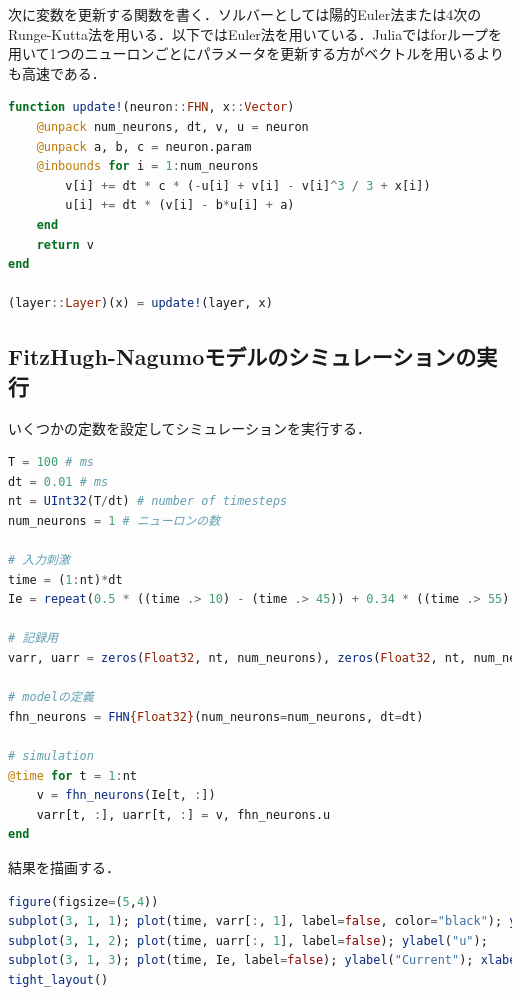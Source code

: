 次に変数を更新する関数を書く．ソルバーとしては陽的Euler法または4次のRunge-Kutta法を用いる．以下ではEuler法を用いている．Juliaではforループを用いて1つのニューロンごとにパラメータを更新する方がベクトルを用いるよりも高速である．
\begin{lstlisting}[language=julia]
function update!(neuron::FHN, x::Vector)
    @unpack num_neurons, dt, v, u = neuron
    @unpack a, b, c = neuron.param
    @inbounds for i = 1:num_neurons
        v[i] += dt * c * (-u[i] + v[i] - v[i]^3 / 3 + x[i])
        u[i] += dt * (v[i] - b*u[i] + a)
    end
    return v
end

(layer::Layer)(x) = update!(layer, x)
\end{lstlisting}
\subsection{FitzHugh-Nagumoモデルのシミュレーションの実行}
いくつかの定数を設定してシミュレーションを実行する．
\begin{lstlisting}[language=julia]
T = 100 # ms
dt = 0.01 # ms
nt = UInt32(T/dt) # number of timesteps
num_neurons = 1 # ニューロンの数

# 入力刺激
time = (1:nt)*dt
Ie = repeat(0.5 * ((time .> 10) - (time .> 45)) + 0.34 * ((time .> 55) - (time .> 90)), 1, num_neurons)  # injection current

# 記録用
varr, uarr = zeros(Float32, nt, num_neurons), zeros(Float32, nt, num_neurons)

# modelの定義
fhn_neurons = FHN{Float32}(num_neurons=num_neurons, dt=dt)

# simulation
@time for t = 1:nt
    v = fhn_neurons(Ie[t, :])
    varr[t, :], uarr[t, :] = v, fhn_neurons.u
end
\end{lstlisting}
結果を描画する．
\begin{lstlisting}[language=julia]
figure(figsize=(5,4))
subplot(3, 1, 1); plot(time, varr[:, 1], label=false, color="black"); ylabel("v")
subplot(3, 1, 2); plot(time, uarr[:, 1], label=false); ylabel("u"); 
subplot(3, 1, 3); plot(time, Ie, label=false); ylabel("Current"); xlabel("Times (ms)")
tight_layout()
\end{lstlisting}
